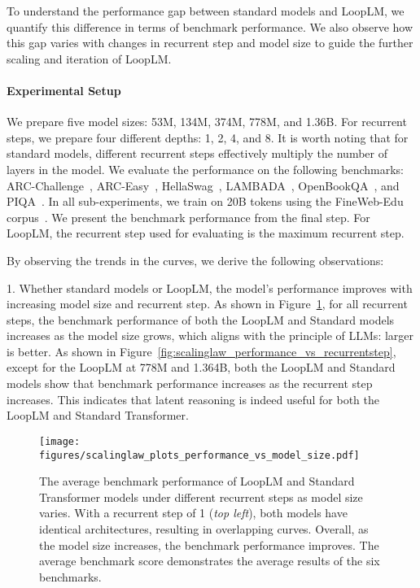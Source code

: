 \documentclass[]{bytedance_seed}
\newcommand{\1}{\mathbf{1}}
\newcommand{\ut}{LoopLM}
\begin{document}
To understand the performance gap between standard models and \ut{}, we quantify this difference in terms of benchmark performance. We also observe how this gap varies with changes in recurrent step and model size to guide the further scaling and iteration of \ut{}.

\paragraph{Experimental Setup} We prepare five model sizes: 53M, 134M, 374M, 778M, and 1.36B. For recurrent steps, we prepare four different depths: 1, 2, 4, and 8. It is worth noting that for standard models, different recurrent steps effectively multiply the number of layers in the model. We evaluate the performance on the following benchmarks: ARC-Challenge~\citep{allenai:arc}, ARC-Easy~\citep{allenai:arc}, HellaSwag~\citep{zellers2019hellaswag}, LAMBADA~\citep{lambada}, OpenBookQA~\citep{mihaylov2018can}, and PIQA~\citep{bisk2020piqa}. In all sub-experiments, we train on 20B tokens using the FineWeb-Edu corpus~\citep{penedo2024fineweb}. We present the benchmark performance from the final step. For \ut{}, the recurrent step used for evaluating is the maximum recurrent step. 

By observing the trends in the curves, we derive the following observations:

1. Whether standard models or \ut{}, the model's performance improves with increasing model size and recurrent step. As shown in Figure~\ref{fig:scalinglaw_performance_vs_modelsize}, for all recurrent steps, the benchmark performance of both the \ut{} and Standard models increases as the model size grows, which aligns with the principle of LLMs: larger is better. As shown in Figure~\ref{fig:scalinglaw_performance_vs_recurrentstep}, except for the \ut{} at 778M and 1.364B, both the \ut{} and Standard models show that benchmark performance increases as the recurrent step increases. This indicates that latent reasoning is indeed useful for both the \ut{} and Standard Transformer.

\begin{figure}[htbp!]
    \centering
    \texttt{[image: figures/scalinglaw\_plots\_performance\_vs\_model\_size.pdf]}
    \caption{The average benchmark performance of \ut{} and Standard Transformer models under different recurrent steps as model size varies. With a recurrent step of 1 (\textit{top left}), both models have identical architectures, resulting in overlapping curves. Overall, as the model size increases, the benchmark performance improves. The average benchmark score demonstrates the average results of the six benchmarks.}
    \label{fig:scalinglaw_performance_vs_modelsize}
\end{figure}
\end{document}
